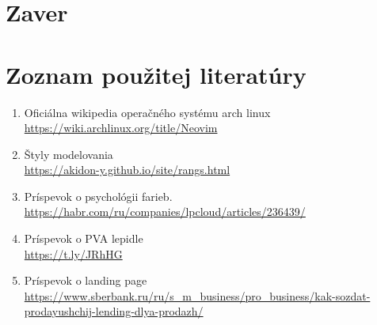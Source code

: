   \newpage
  \section{Zaver}

  \newpage
  \section{Zoznam použitej literatúry}

    \begin{enumerate}
      \item{
          Oficiálna wikipedia operačného systému arch linux \\
          \url{https://wiki.archlinux.org/title/Neovim}
      }
      \item{
          Štyly modelovania\\
          \url{https://akidon-y.github.io/site/rangs.html}
      }
      \item{
          Príspevok o psychológii farieb.\\
          \url{https://habr.com/ru/companies/lpcloud/articles/236439/}
      }
      \item{
          Príspevok o PVA lepidle \\
          \url{https://t.ly/JRhHG}
      }
      \item{
          Príspevok o landing page \\
          \url{https://www.sberbank.ru/ru/s_m_business/pro_business/kak-sozdat-prodayushchij-lending-dlya-prodazh/}
      }
    \end{enumerate}


